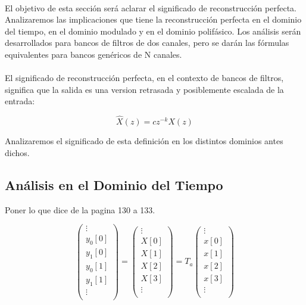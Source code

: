 \paragraph{}
El objetivo de esta sección será aclarar el significado de reconstrucción perfecta. Analizaremos las implicaciones que tiene la reconstrucción perfecta en el dominio del tiempo, en el dominio modulado y en el dominio polifásico. Los análisis serán desarrollados para bancos de filtros de dos canales, pero se darán las fórmulas equivalentes para bancos genéricos de N canales.
\paragraph{}
El significado de reconstrucción perfecta, en el contexto de bancos de filtros, significa que la salida es una version retrasada y posiblemente escalada de la entrada:

\begin{equation}
	\hat{X}(z) = c z^{-k} X(z)
\end{equation}

Analizaremos el significado de esta definición en los distintos dominios antes dichos.

\subsection{Análisis en el Dominio del Tiempo}

Poner lo que dice de la pagina 130 a 133.

\begin{equation}
	\begin{pmatrix}
		\vdots \\
		y_0[0] \\
		y_1[0] \\
		y_0[1] \\
		y_1[1] \\
		\vdots \\
	\end{pmatrix}
	=
	\begin{pmatrix}
		\vdots \\
		X[0] \\
		X[1] \\
		X[2] \\
		X[3] \\
		\vdots \\
	\end{pmatrix}
	= T_a 
	\begin{pmatrix}
		\vdots \\
		x[0] \\
		x[1] \\
		x[2] \\
		x[3] \\
		\vdots \\
	\end{pmatrix}
\end{equation}

